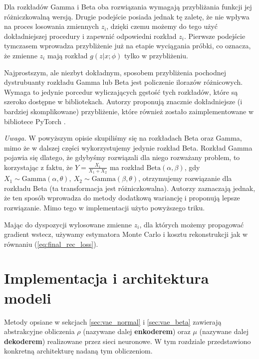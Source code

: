 \documentclass{iithesis}
\begin{document}
Dla rozkładów Gamma i Beta oba rozwiązania wymagają przybliżania funkcji
jej różniczkowalną wersją. Drugie podejście posiada jednak tę zaletę,
że nie wpływa na proces losowania zmiennych $z_i$, dzięki czemu możemy do tego użyć
dokładniejszej procedury i zapewnić odpowiedni rozkład $z_i$. Pierwsze podejście
tymczasem wprowadza przybliżenie już na etapie wyciągania próbki, co oznacza, że zmienne
$z_i$ mają rozkład $g(z|x;\phi)$ tylko w przybliżeniu.

Najprostszym, ale niezbyt dokładnym, sposobem przybliżenia pochodnej dystrubuanty
rozkładu Gamma lub Beta jest policzenie ilorazów różnicowych.
Wymaga to jedynie porcedur wyliczających gęstość tych rozkładów,
które są szeroko dostępne w bibliotekach.
Autorzy \cite{pathwise_gradients} proponują znacznie dokładniejsze (i bardziej skomplikowane)
przybliżenie, które również zostało zaimplementowane w bibliotece PyTorch \cite{pytorch}.

\noindent \textit{Uwaga.} W powyższym opisie skupiliśmy się na rozkładach Beta oraz Gamma,
mimo że w dalszej części wykorzystujemy jedynie rozkład Beta. Rozkład Gamma pojawia się dlatego,
że gdybyśmy rozwiązali dla niego rozważany problem, to korzystając z faktu, że $Y = \frac{X_1}{X_1+X_2}$
ma rozkład $\text{Beta}(\alpha,\beta)$, gdy $X_1 \sim \text{Gamma}(\alpha,\theta),\ X_2 \sim \text{Gamma}(\beta,\theta)$,
otrzymujemy rozwiązanie dla rozkładu Beta (ta transformacja jest różniczkowalna).
Autorzy \cite{pathwise_gradients} zaznaczają jednak, że ten sposób wprowadza do metody dodatkową wariancję
i proponują lepsze rozwiązanie. Mimo tego w implementacji użyto powyższego triku.

Mając do dyspozycji wylosowane zmienne $z_i$, dla których możemy propagować gradient
wstecz, używamy estymatora Monte Carlo i kosztu rekonstrukcji jak w równaniu (\ref{eq:final_rec_loss}).


\chapter{Implementacja i architektura modeli}
Metody opsiane w sekcjach \ref{sec:vae_normal} i \ref{sec:vae_beta} zawierają
abstrakcyjne obliczenia $\rho$ (nazywane dalej \textbf{enkoderem}) oraz $\mu$
(nazywane dalej \textbf{dekoderem}) realizowane przez sieci neuronowe.
W tym rozdziale przedstawiono konkretną architekturę nadaną tym obliczeniom.
\end{document}
